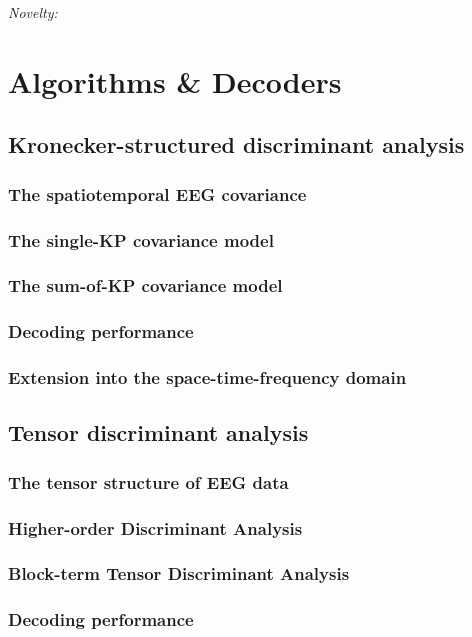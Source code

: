 \emph{Novelty:}


\part{Algorithms \& Decoders}

\chapter{Kronecker-structured discriminant analysis}
\section{The spatiotemporal EEG covariance}
\section{The single-KP covariance model}
\section{The sum-of-KP covariance model}
\section{Decoding performance}
\section{Extension into the space-time-frequency domain}

\chapter{Tensor discriminant analysis}
\section{The tensor structure of EEG data}
\section{Higher-order Discriminant Analysis}
\section{Block-term Tensor Discriminant Analysis}
\section{Decoding performance}
